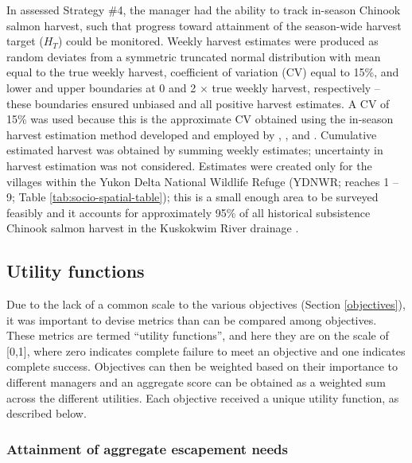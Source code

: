 \documentclass[12pt,]{book}
\theoremstyle{definition}
\theoremstyle{definition}
\theoremstyle{definition}
\theoremstyle{remark}
\begin{document}
\noindent
In assessed Strategy \#4, the manager had the ability to track in-season
Chinook salmon harvest, such that progress toward attainment of the
season-wide harvest target (\(H_T\)) could be monitored. Weekly harvest
estimates were produced as random deviates from a symmetric truncated
normal distribution with mean equal to the true weekly harvest,
coefficient of variation (CV) equal to 15\%, and lower and upper
boundaries at 0 and 2 \(\times\) true weekly harvest, respectively --
these boundaries ensured unbiased and all positive harvest estimates. A
CV of 15\% was used because this is the approximate CV obtained using
the in-season harvest estimation method developed and employed by
\citet{staton-coggins-2016}, \citet{staton-coggins-2017}, and
\citet{staton-2018}. Cumulative estimated harvest was obtained by
summing weekly estimates; uncertainty in harvest estimation was not
considered. Estimates were created only for the villages within the
Yukon Delta National Wildlife Refuge (YDNWR; reaches 1 -- 9; Table
\ref{tab:socio-spatial-table}); this is a small enough area to be
surveyed feasibly and it accounts for approximately 95\% of all
historical subsistence Chinook salmon harvest in the Kuskokwim River
drainage \citep{hamazaki-2011}.

\subsection{Utility functions}\label{utility-funcs}

\noindent
Due to the lack of a common scale to the various objectives (Section
\ref{objectives}), it was important to devise metrics than can be
compared among objectives. These metrics are termed ``utility
functions'', and here they are on the scale of {[}0,1{]}, where zero
indicates complete failure to meet an objective and one indicates
complete success. Objectives can then be weighted based on their
importance to different managers and an aggregate score can be obtained
as a weighted sum across the different utilities. Each objective
received a unique utility function, as described below.

\subsubsection{Attainment of aggregate escapement needs}\label{S-metric}
\end{document}
